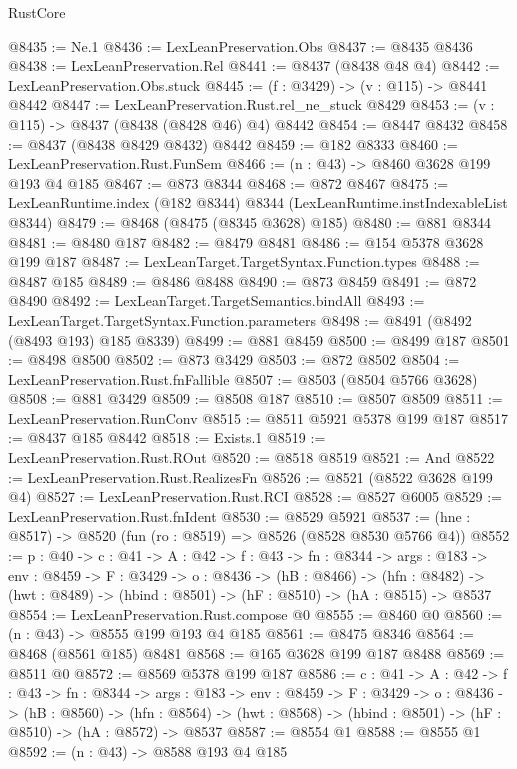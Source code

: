 \begin{lexlean}{RustCore}
\begin{coremodule}
@8435 := Ne.{1}
@8436 := LexLeanPreservation.Obs
@8437 := @8435 @8436
@8438 := LexLeanPreservation.Rel
@8441 := @8437 (@8438 @48 @4)
@8442 := LexLeanPreservation.Obs.stuck
@8445 := (f : @3429) -> (v : @115) -> @8441 @8442
@8447 := LexLeanPreservation.Rust.rel_ne_stuck @8429
@8453 := (v : @115) -> @8437 (@8438 (@8428 @46) @4) @8442
@8454 := @8447 @8432
@8458 := @8437 (@8438 @8429 @8432) @8442
@8459 := @182 @8333
@8460 := LexLeanPreservation.Rust.FunSem
@8466 := (n : @43) -> @8460 @3628 @199 @193 @4 @185
@8467 := @873 @8344
@8468 := @872 @8467
@8475 := LexLeanRuntime.index (@182 @8344) @8344 (LexLeanRuntime.instIndexableList @8344)
@8479 := @8468 (@8475 (@8345 @3628) @185)
@8480 := @881 @8344
@8481 := @8480 @187
@8482 := @8479 @8481
@8486 := @154 @5378 @3628 @199 @187
@8487 := LexLeanTarget.TargetSyntax.Function.types
@8488 := @8487 @185
@8489 := @8486 @8488
@8490 := @873 @8459
@8491 := @872 @8490
@8492 := LexLeanTarget.TargetSemantics.bindAll
@8493 := LexLeanTarget.TargetSyntax.Function.parameters
@8498 := @8491 (@8492 (@8493 @193) @185 @8339)
@8499 := @881 @8459
@8500 := @8499 @187
@8501 := @8498 @8500
@8502 := @873 @3429
@8503 := @872 @8502
@8504 := LexLeanPreservation.Rust.fnFallible
@8507 := @8503 (@8504 @5766 @3628)
@8508 := @881 @3429
@8509 := @8508 @187
@8510 := @8507 @8509
@8511 := LexLeanPreservation.RunConv
@8515 := @8511 @5921 @5378 @199 @187
@8517 := @8437 @185 @8442
@8518 := Exists.{1}
@8519 := LexLeanPreservation.Rust.ROut
@8520 := @8518 @8519
@8521 := And
@8522 := LexLeanPreservation.Rust.RealizesFn
@8526 := @8521 (@8522 @3628 @199 @4)
@8527 := LexLeanPreservation.Rust.RCI
@8528 := @8527 @6005
@8529 := LexLeanPreservation.Rust.fnIdent
@8530 := @8529 @5921
@8537 := (hne : @8517) -> @8520 (fun (ro : @8519) => @8526 (@8528 @8530 @5766 @4))
@8552 := {p : @40} ->
  {c : @41} ->
  {A : @42} ->
  {f : @43} ->
  {fn : @8344} ->
  {args : @183} ->
  {env : @8459} ->
  {F : @3429} ->
  {o : @8436} ->
  (hB : @8466) ->
  (hfn : @8482) -> (hwt : @8489) -> (hbind : @8501) -> (hF : @8510) -> (hA : @8515) -> @8537
@8554 := LexLeanPreservation.Rust.compose @0
@8555 := @8460 @0
@8560 := (n : @43) -> @8555 @199 @193 @4 @185
@8561 := @8475 @8346
@8564 := @8468 (@8561 @185) @8481
@8568 := @165 @3628 @199 @187 @8488
@8569 := @8511 @0
@8572 := @8569 @5378 @199 @187
@8586 := {c : @41} ->
  {A : @42} ->
  {f : @43} ->
  {fn : @8344} ->
  {args : @183} ->
  {env : @8459} ->
  {F : @3429} ->
  {o : @8436} ->
  (hB : @8560) ->
  (hfn : @8564) -> (hwt : @8568) -> (hbind : @8501) -> (hF : @8510) -> (hA : @8572) -> @8537
@8587 := @8554 @1
@8588 := @8555 @1
@8592 := (n : @43) -> @8588 @193 @4 @185

\end{coremodule}
\end{lexlean}
